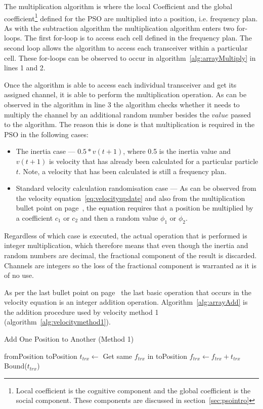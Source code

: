 The multiplication algorithm is where the local Coefficient and the global coefficient\footnote{Local coefficient is the cognitive component and the global coefficient is the social component. These components are discussed in section~\ref{sec:psointro}} defined for the PSO are multiplied into a position, i.e. frequency plan. As with the subtraction algorithm the multiplication algorithm enters two for-loops. The first for-loop is to access each cell defined in the frequency plan. The second loop allows the algorithm to access each transceiver within a particular cell. These for-loops can be observed to occur in algorithm~\ref{alg:arrayMultiply} in lines 1 and 2.

Once the algorithm is able to access each individual transceiver and get its assigned channel, it is able to perform the multiplication operation. As can be observed in the algorithm in line 3 the algorithm checks whether it needs to multiply the channel by an additional random number besides the $value$ passed to the algorithm. The reason this is done is that multiplication is required in the PSO in the following cases:

\begin{itemize}
\item The inertia case --- $0.5 * v(t+1)$, where 0.5 is the inertia value and $v(t+1)$ is velocity that has already been calculated for a particular particle $t$. Note, a velocity that has been calculated is still a frequency plan.
\item Standard velocity calculation randomisation case --- As can be observed from the velocity equation~\ref{eq:velocityupdate} and also from the multiplication bullet point on page~\pageref{lst:velocitybreakup}, the equation requires that a position be multiplied by a coefficient $c_1$ or $c_2$ and then a random value $\phi_1$ or $\phi_2$. 
\end{itemize}

Regardless of which case is executed, the actual operation that is performed is integer multiplication, which therefore means that even though the inertia and random numbers are decimal, the fractional component of the result is discarded. Channels are integers so the loss of the fractional component is warranted as it is of no use.

As per the last bullet point on page~\pageref{lst:velocitybreakup} the last basic operation that occurs in the velocity equation is an integer addition operation. Algorithm~\ref{alg:arrayAdd} is the addition procedure used by velocity method 1 (algorithm~\ref{alg:velocitymethod1}).
\begin{algorithm}
\caption{Add One Position to Another (Method 1)}
\label{alg:arrayAdd}
\begin{algorithmic}[1]
	\Require fromPosition
	\Require toPosition
			\State $t_{trx} \leftarrow$ Get same $f_{trx}$ in toPosition
			\State $f_{trx} \leftarrow f_{trx} + t_{trx}$
			\State Bound($t_{trx}$)
		\EndFor
	\EndFor
\end{algorithmic}
\end{algorithm}

